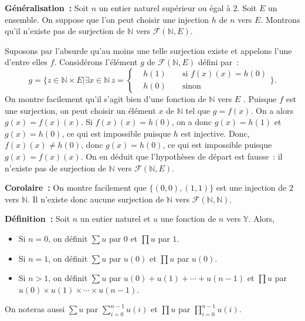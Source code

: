 \medskip

\noindent\textbf{Généralisation :}  Soit $n$ un entier naturel supérieur ou égal à $2$. 
    Soit $E$ un ensemble.
    On suppose que l'on peut choisir une injection $h$ de $n$ vers $E$. 
    Montrons qu'il n'existe pas de surjection de $\mathbb{N}$ vers $\mathcal{F}(\mathbb{N}, E)$. 

    Suposons par l'absurde qu'au moins une telle surjection existe et appelons l'une d'entre elles $f$. 
    Considérons l'élément $g$ de $\mathcal{F}(\mathbb{N}, E)$ défini par :%
    \begin{equation*}
        g = \lbrace
            z \in \mathbb{N} \times E
            \vert
            \exists x \in \mathbb{N} \, 
                z = \left\lbrace\begin{aligned}
                    & h(1) & & \textrm{ si } f(x)(x) = h(0) \\
                    & h(0) & & \textrm{ sinon }
                \end{aligned}\right.
        \rbrace .
    \end{equation*}
    On montre facilement qu'il s'agit bien d'une fonction de $\mathbb{N}$ vers $E$ .
    Puisque $f$ est une surjection, on peut choisir un élément $x$ de $\mathbb{N}$ tel que $g = f(x)$. 
    On a alors $g(x) = f(x)(x)$. 
    Si $f(x)(x) = h(0)$, on a donc $g(x) = h(1)$ et $g(x) = h(0)$, ce qui est impossible puisque $h$ est injective.
    Donc, $f(x)(x) \neq h(0)$, donc $g(x) = h(0)$, ce qui est impossible puisque $g(x) = f(x)(x)$.
    On en déduit que l'hypothèses de départ est fausse : il n'existe pas de surjection de $\mathbb{N}$ vers $\mathcal{F}(\mathbb{N}, E)$. 

\medskip

\noindent\textbf{Corolaire :}  On montre facilement que $\lbrace (0, 0), (1, 1) \rbrace$ est une injection de $2$ vers $\mathbb{N}$.
    Il n'existe donc aucune surjection de $\mathbb{N}$ vers $\mathcal{F} (\mathbb{N}, \mathbb{N})$.

\medskip

\noindent\textbf{Définition :} Soit $n$ un entier naturel et $u$ une fonction de $n$ vers $\mathbb{Y}$. 
    Alors, 
    \begin{itemize}[nosep]
        \item Si $n = 0$, on définit $\sum u$ par $0$ et $\prod u$ par $1$.
        \item Si $n = 1$, on définit $\sum u$ par $u(0)$ et $\prod u$ par $u(0)$.
        \item Si $n > 1$, on définit $\sum u$ par $u(0) + u(1) + \cdots + u(n-1)$ et $\prod u$ par $u(0) \times u(1) \times \cdots \times u(n-1)$.
    \end{itemize}
    On noteras aussi $\sum u$ par $\sum_{i=0}^{n-1} u(i)$ et $\prod u$ par $\prod_{i=0}^{n-1} u(i)$.
